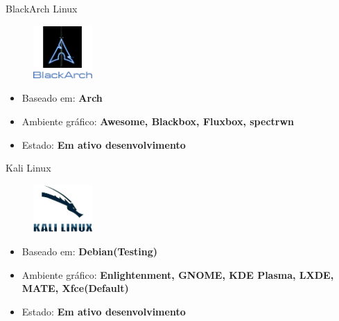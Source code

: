 \documentclass{beamer}
\begin{document}
\begin{frame}{BlackArch Linux}

\begin{figure}[h]
    \includegraphics[width=0.2\textwidth]{distros/blackarch.png}
    \centering
\end{figure}

\begin{itemize}
    \item Baseado em: \textbf{Arch}
    \item Ambiente gráfico: \textbf{Awesome, Blackbox, Fluxbox, spectrwn}
    \item Estado: \textbf{Em ativo desenvolvimento}
\end{itemize}

\end{frame}
\begin{frame}{Kali Linux}

\begin{figure}[h]
    \includegraphics[width=0.2\textwidth]{distros/kali.png}
    \centering
\end{figure}

\begin{itemize}
    \item Baseado em: \textbf{Debian(Testing)}
    \item Ambiente gráfico: \textbf{Enlightenment, GNOME, KDE Plasma, LXDE, MATE, Xfce(Default)}
    \item Estado: \textbf{Em ativo desenvolvimento}
\end{itemize}
    
\end{frame}
\end{document}
